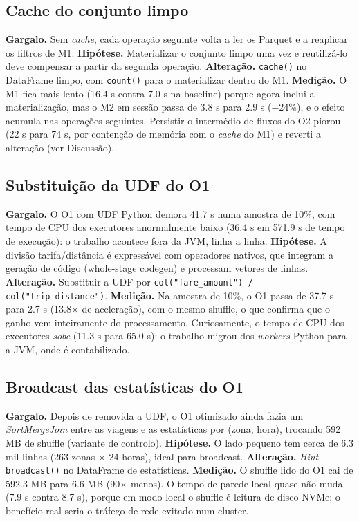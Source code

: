\documentclass[sigconf]{acmart}
\begin{document}
\subsection{Cache do conjunto limpo}

\textbf{Gargalo.} Sem \emph{cache}, cada operação seguinte volta a ler
os Parquet e a reaplicar os filtros de M1. \textbf{Hipótese.} Materializar
o conjunto limpo uma vez e reutilizá-lo deve compensar a partir da
segunda operação. \textbf{Alteração.} \texttt{cache()} no DataFrame
limpo, com \texttt{count()} para o materializar dentro do M1. \textbf{Medição.} O M1 fica mais lento (16.4 s contra 7.0 s na baseline) porque agora inclui a materialização, mas o M2 em sessão passa de 3.8 s para 2.9 s ($-$24\%), e o efeito acumula nas operações seguintes. Persistir o intermédio de fluxos do O2 piorou (22 s para 74 s, por contenção de memória com o \emph{cache} do M1) e reverti a alteração (ver Discussão).

\subsection{Substituição da UDF do O1}

\textbf{Gargalo.} O O1 com UDF Python demora 41.7 s numa amostra de
10\%, com tempo de CPU dos executores anormalmente baixo (36.4 s em
571.9 s de tempo de execução): o trabalho acontece fora da JVM, linha a
linha. \textbf{Hipótese.} A divisão tarifa/distância é expressável com
operadores nativos, que integram a geração de código (whole-stage
codegen) e processam vetores de linhas. \textbf{Alteração.} Substituir a
UDF por \texttt{col("fare\_amount") / col("trip\_distance")}.
\textbf{Medição.} Na amostra de 10\%, o O1 passa de 37.7 s para 2.7 s
(13.8$\times$ de aceleração), com o mesmo shuffle, o que confirma que o
ganho vem inteiramente do processamento. Curiosamente, o tempo de CPU
dos executores \emph{sobe} (11.3 s para 65.0 s): o trabalho migrou dos
\emph{workers} Python para a JVM, onde é contabilizado.

\subsection{Broadcast das estatísticas do O1}

\textbf{Gargalo.} Depois de removida a UDF, o O1 otimizado ainda fazia
um \emph{SortMergeJoin} entre as viagens e as estatísticas por (zona,
hora), trocando 592 MB de shuffle (variante de controlo). \textbf{Hipótese.} O lado pequeno tem cerca de 6.3 mil linhas (263 zonas $\times$ 24 horas), ideal para broadcast. \textbf{Alteração.} \emph{Hint} \texttt{broadcast()} no DataFrame de estatísticas. \textbf{Medição.} O shuffle lido do O1 cai de 592.3 MB para 6.6 MB (90$\times$ menos). O tempo de parede local quase não muda (7.9 s contra 8.7 s), porque em modo local o shuffle é leitura de disco NVMe; o benefício real seria o tráfego de rede evitado num cluster.
\end{document}
